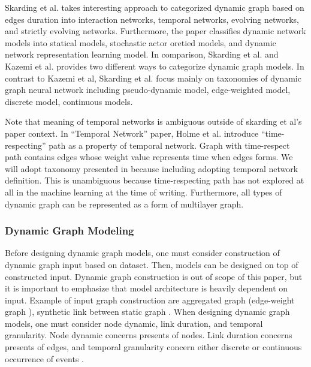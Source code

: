 \documentclass{IEEEtran}
\begin{document}
Skarding et al. \cite{skardingFoundationsModelingDynamic2021} takes interesting approach to categorized dynamic graph based on edges duration into interaction networks, temporal networks, evolving networks, and strictly evolving networks. Furthermore, the paper classifies dynamic network models into statical models, stochastic actor oretied models, and dynamic network representation learning model. In comparison, Skarding et al. \cite{skardingFoundationsModelingDynamic2021} and Kazemi et al. \cite{kazemiRepresentationLearningDynamica} provides two different ways to categorize dynamic graph models. In contrast to Kazemi et al, Skarding et al. focus mainly on taxonomies of dynamic graph neural network including pseudo-dynamic model, edge-weighted model, discrete model, continuous models.

Note that meaning of temporal networks is ambiguous outside of skarding et al's paper \cite{skardingFoundationsModelingDynamic2021} context. In ``Temporal Network'' paper, Holme et al. \cite{holme2012temporal} introduce ``time-respecting'' path as a property of temporal network. Graph with time-respect path contains edges whose weight value represents time when edges forms. We will adopt taxonomy presented in \cite{skardingFoundationsModelingDynamic2021} because including adopting temporal network definition. This is unambiguous because time-respecting path has not explored at all in the machine learning at the time of writing. Furthermore, all types of dynamic graph can be represented as a form of multilayer graph. \cite{kivela2014multilayer}
\subsubsection{Dynamic Graph Modeling}
\label{sec:org1f8d00d}
Before designing dynamic graph models, one must consider construction of dynamic graph input based on dataset. Then, models can be designed on top of constructed input. Dynamic graph construction is out of scope of this paper, but it is important to emphasize that model architecture is heavily dependent on input. Example of input graph construction are aggregated graph (edge-weight graph \cite{qu2020continuous}), synthetic link between static graph \cite{kapoor2020examining}. When designing dynamic graph models, one must consider node dynamic, link duration, and temporal granularity. Node dynamic concerns presents of nodes. Link duration concerns presents of edges, and temporal granularity concern either discrete or continuous occurrence of events \cite{kazemiRepresentationLearningDynamica}.
\end{document}
